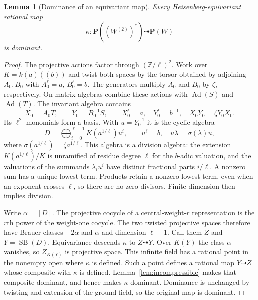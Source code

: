 \documentclass[11pt]{article}
\newtheorem{lemma}[theorem]{Lemma}
\theoremstyle{definition}\newtheorem{definition}[theorem]{Definition}
\theoremstyle{remark}\newtheorem{remark}[theorem]{Remark}
\newcommand{\PP}{\mathbf P}
\newcommand{\SB}{\operatorname{SB}}
\begin{document}
\begin{lemma}[Dominance of an equivariant map]\label{lem:dominance}
Every Heisenberg-equivariant rational map
\[
 \kappa:\PP((W^{(2)})^*)\dashrightarrow\PP(W)
\]
is dominant.
\end{lemma}
\begin{proof}
The projective actions factor through $(\mathbb Z/\ell)^2$. Work over $K=k(a)((b))$ and twist both spaces by the torsor obtained by adjoining $A_0,B_0$ with $A_0^\ell=a$, $B_0^\ell=b$. The generators multiply $A_0$ and $B_0$ by $\zeta$, respectively. On matrix algebras combine these actions with $\operatorname{Ad}(S)$ and $\operatorname{Ad}(T)$. The invariant algebra contains
\[
 X_0=A_0T,\qquad Y_0=B_0^{-1}S,
 \qquad X_0^\ell=a,\quad Y_0^\ell=b^{-1},
 \quad X_0Y_0=\zeta Y_0X_0.
\]
Its $\ell^2$ monomials form a basis. With $u=Y_0^{-1}$ it is the cyclic algebra
\[
 D=\bigoplus_{i=0}^{\ell-1}K(a^{1/\ell})u^i,
 \qquad u^\ell=b,\quad u\lambda=\sigma(\lambda)u,
\]
where $\sigma(a^{1/\ell})=\zeta a^{1/\ell}$. This algebra is a division algebra: the extension $K(a^{1/\ell})/K$ is unramified of residue degree $\ell$ for the $b$-adic valuation, and the valuations of the summands $\lambda_i u^i$ have distinct fractional parts $i/\ell$. A nonzero sum has a unique lowest term. Products retain a nonzero lowest term, even when an exponent crosses $\ell$, so there are no zero divisors. Finite dimension then implies division.

Write $\alpha=[D]$. The projective cocycle of a central-weight-$r$ representation is the $r$th power of the weight-one cocycle. The two twisted projective spaces therefore have Brauer classes $-2\alpha$ and $\alpha$ and dimension $\ell-1$. Call them $Z$ and $Y=\SB(D)$. Equivariance descends $\kappa$ to $Z\dashrightarrow Y$. Over $K(Y)$ the class $\alpha$ vanishes, so $Z_{K(Y)}$ is projective space. This infinite field has a rational point in the nonempty open where $\kappa$ is defined. Such a point defines a rational map $Y\dashrightarrow Z$ whose composite with $\kappa$ is defined. Lemma~\ref{lem:incompressible} makes that composite dominant, and hence makes $\kappa$ dominant. Dominance is unchanged by twisting and extension of the ground field, so the original map is dominant.
\end{proof}
\end{document}
